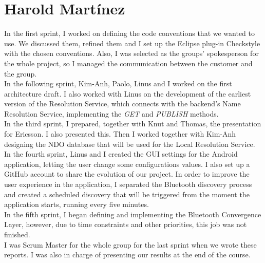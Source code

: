 \section{Harold Mart\'{i}nez}

In the first sprint, I worked on defining the code conventions that we wanted to use. 
We discussed them, refined them and I set up the Eclipse plug-in Checkstyle with the chosen conventions.
Also, I was selected as the groups' spokesperson for the whole project, so I managed the communication 
between the customer and the group.\\

In the following sprint, Kim-Anh, Paolo, Linus and I worked on the first architecture draft.
I also worked with Linus on the development of the earliest version of the Resolution Service, which connects with the 
backend's Name Resolution Service, implementing the \emph{GET} and \emph{PUBLISH} methods.\\

In the third sprint, I prepared, together with Knut and Thomas, the presentation for Ericsson. I also presented this. 
Then I worked together with Kim-Anh designing the NDO database that will be used for the 
Local Resolution Service.\\

In the fourth sprint, Linus and I created the GUI settings for the Android application, letting the user change 
some configurations values. I also set up a GitHub account to share the evolution of our project. In order to improve 
the user experience in the application, I separated the Bluetooth discovery process and created a scheduled discovery that 
will be triggered from the moment the application starts, running every five minutes.\\

In the fifth sprint, I began defining and implementing the Bluetooth Convergence Layer, however, due to time constraints 
and other priorities, this job was not finished. \\

I was Scrum Master for the whole group for the last sprint when we wrote these reports. I was also in charge of presenting 
our results at the end of the course.\\

